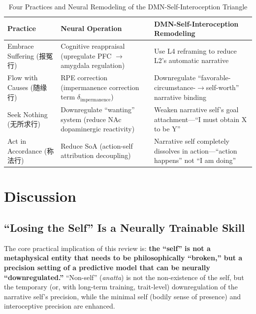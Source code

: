 \documentclass[11pt,a4paper]{article}
\begin{document}
\begin{table}[htbp]
\centering
\caption{Four Practices and Neural Remodeling of the DMN-Self-Interoception Triangle}
\label{tab:four_practices}
\begin{tabular}{@{}p{2.5cm}p{4cm}p{6.5cm}@{}}
\toprule
\textbf{Practice} & \textbf{Neural Operation} & \textbf{DMN-Self-Interoception Remodeling} \\
\midrule
Embrace Suffering (报冤行) & Cognitive reappraisal (upregulate PFC $\rightarrow$ amygdala regulation) & Use L4 reframing to reduce L2's automatic narrative \\
\addlinespace
Flow with Causes (随缘行) & RPE correction (impermanence correction term $\delta_{\text{impermanence}}$) & Downregulate ``favorable-circumstance-$\rightarrow$self-worth'' narrative binding \\
\addlinespace
Seek Nothing (无所求行) & Downregulate ``wanting'' system (reduce NAc dopaminergic reactivity) & Weaken narrative self's goal attachment---``I must obtain X to be Y'' \\
\addlinespace
Act in Accordance (称法行) & Reduce SoA (action-self attribution decoupling) & Narrative self completely dissolves in action---``action happens'' not ``I am doing'' \\
\bottomrule
\end{tabular}
\end{table}

\section{Discussion}

\subsection{``Losing the Self'' Is a Neurally Trainable Skill}

The core practical implication of this review is: \textbf{the ``self'' is not a metaphysical entity that needs to be philosophically ``broken,'' but a precision setting of a predictive model that can be neurally ``downregulated.''} ``Non-self'' (\textit{anatta}) is not the non-existence of the self, but the temporary (or, with long-term training, trait-level) downregulation of the narrative self's precision, while the minimal self (bodily sense of presence) and interoceptive precision are enhanced.
\end{document}
